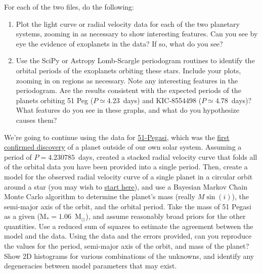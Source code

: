 \documentclass[10pt]{article}
\begin{document}
\vspace{2mm}
\noindent
For each of the two files, do the following:

\begin{enumerate}

\item Plot the light curve or radial velocity data for each of the two
planetary systems, zooming in as necessary to show interesting
features.  Can you see by eye the evidence of exoplanets in the data?
If so, what do you see?

\item Use the SciPy or Astropy Lomb-Scargle periodogram routines to identify
the orbital periods of the exoplanets orbiting these stars.  Include
your plots, zooming in on regions as necessary.  Note any interesting
features in the periodogram.  Are the results consistent with the
expected periods of the planets orbiting 51 Peg ($P \simeq 4.23$~days)
and KIC-8554498 ($P \simeq 4.78$~days)?  What features do you see in
these graphs, and what do you hypothesize causes them?

\end{enumerate}

\vspace{5mm}

 We're going to continue using the
data for
\href{https://en.wikipedia.org/wiki/51\_Pegasi\_b}{51-Pegasi}, which
was the \href{http://adsabs.harvard.edu/abs/1995Natur.378..355M}{first
  confirmed discovery} of a planet outside of our own solar system.
Assuming a period of $P = 4.230785$~days, created a stacked radial
velocity curve that folds all of the orbital data you have been
provided into a single period.  Then, create a model for the observed
radial velocity curve of a single planet in a circular orbit around a
star (you may wish to
\href{https://en.wikipedia.org/wiki/Doppler\_spectroscopy}{start
  here}), and use a Bayesian Markov Chain Monte Carlo algorithm to
determine the planet's mass (really $M \sin(i)$), the semi-major axis
of the orbit, and the orbital period.  Take the mass of 51 Pegasi as a
given (M$_* = 1.06$~M$_\odot$), and assume reasonably broad priors for
the other quantities.  Use a reduced sum of squares to estimate the
agreement between the model and the data.  Using the data and the
errors provided, can you reproduce the values for the period,
semi-major axis of the orbit, and mass of the planet?  Show 2D
histograms for various combinations of the unknowns, and identify any
degeneracies between model parameters that may exist.
\end{document}
